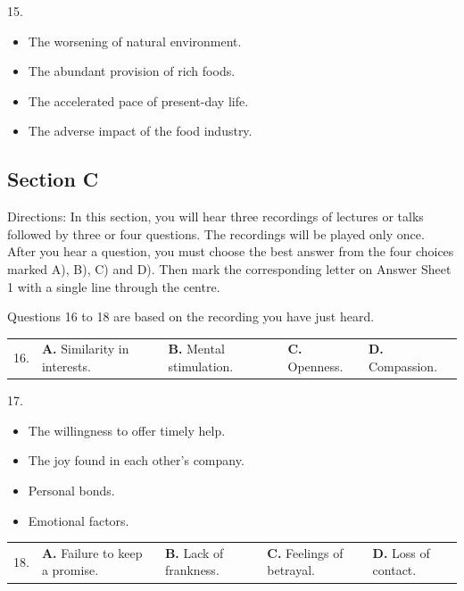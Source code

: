 \documentclass[UTF8,11pt]{ctexart}
\begin{document}
15.


\begin{itemize}[leftmargin=2em,itemsep=.2em,topsep=.4em]\item[A.] The worsening of natural environment.
\item[B.] The abundant provision of rich foods.
\item[C.] The accelerated pace of present-day life.
\item[D.] The adverse impact of the food industry.
\end{itemize}

\subsection*{Section C}


Directions: In this section, you will hear three recordings of lectures or talks followed by three or four questions. The recordings will be played only once. After you hear a question, you must choose the best answer from the four choices marked A), B), C) and D). Then mark the corresponding letter on Answer Sheet 1 with a single line through the centre.


Questions 16 to 18 are based on the recording you have just heard.


\noindent\begin{tabularx}{\linewidth}{@{}lXXXX@{}}16. & \textbf{A.} Similarity in interests. & \textbf{B.} Mental stimulation. & \textbf{C.} Openness. & \textbf{D.} Compassion.\\\end{tabularx}\par

17.


\begin{itemize}[leftmargin=2em,itemsep=.2em,topsep=.4em]\item[A.] The willingness to offer timely help.
\item[B.] The joy found in each other’s company.
\item[C.] Personal bonds.
\item[D.] Emotional factors.
\end{itemize}

\noindent\begin{tabularx}{\linewidth}{@{}lXXXX@{}}18. & \textbf{A.} Failure to keep a promise. & \textbf{B.} Lack of frankness. & \textbf{C.} Feelings of betrayal. & \textbf{D.} Loss of contact.\\\end{tabularx}\par
\end{document}
